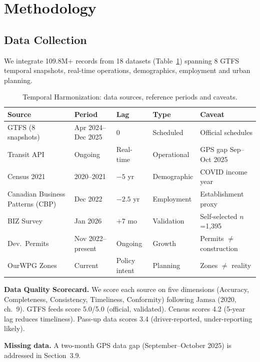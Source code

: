 \documentclass[11pt]{article}
\begin{document}
\section{Methodology}

\subsection{Data Collection}

We integrate 109.8M+ records from 18 datasets (Table~\ref{tab:temporal}) spanning 8 GTFS temporal snapshots, real-time operations, demographics, employment and urban planning.

\begin{table}[H]
\centering\footnotesize
\caption{Temporal Harmonization: data sources, reference periods and caveats.}
\label{tab:temporal}
\begin{tabularx}{\textwidth}{@{}lllll@{}}
\toprule
\textbf{Source} & \textbf{Period} & \textbf{Lag} & \textbf{Type} & \textbf{Caveat} \\
\midrule
GTFS (8 snapshots) & Apr 2024--Dec 2025 & 0 & Scheduled & Official schedules \\
Transit API & Ongoing & Real-time & Operational & GPS gap Sep--Oct 2025 \\
Census 2021 & 2020--2021 & $-5$ yr & Demographic & COVID income year \\
Canadian Business Patterns (CBP) & Dec 2022 & $-2.5$ yr & Employment & Establishment proxy \\
BIZ Survey & Jan 2026 & $+7$ mo & Validation & Self-selected $n$=1,395 \\
Dev.\ Permits & Nov 2022--present & Ongoing & Growth & Permits $\neq$ construction \\
OurWPG Zones & Current & Policy intent & Planning & Zones $\neq$ reality \\
\bottomrule
\end{tabularx}
\end{table}

\textbf{Data Quality Scorecard.} We score each source on five dimensions (Accuracy, Completeness, Consistency, Timeliness, Conformity) following Jamsa (2020, ch.\ 9). GTFS feeds score 5.0/5.0 (official, validated). Census scores 4.2 (5-year lag reduces timeliness). Pass-up data scores 3.4 (driver-reported, under-reporting likely).

\textbf{Missing data.}
A two-month GPS data gap (September--October 2025) is addressed in Section~3.9.
\end{document}
